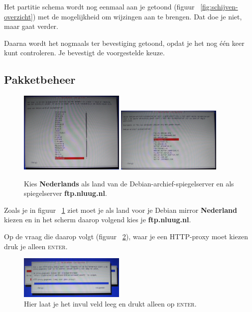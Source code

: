 \documentclass[12pt,a4paper]{article}
\begin{document}
Het partitie schema wordt nog eenmaal aan je getoond (figuur ~\ref{fig:schijven-overzicht}) met de mogelijkheid om wijzingen aan te brengen. Dat doe je niet, maar gaat verder.

Daarna wordt het nogmaals ter bevestiging getoond, opdat je het nog \'{e}\'{e}n keer kunt controleren. Je bevestigt de voorgestelde keuze.


\subsection{Pakketbeheer}

\begin{figure}[H]
\centering
\includegraphics[width=0.45\textwidth]{pakketbeheer-landkeuze-scherm}
\includegraphics[width=0.45\textwidth]{pakketbeheer-mirror-scherm}
\caption{Kies \textbf{Nederlands} als land van de Debian-archief-spiegelserver en als spiegelserver \textbf{ftp.nluug.nl}.}
\label{fig:pakketten}
\end{figure}

Zoals je in figuur ~\ref{fig:pakketten} ziet moet je als land voor je Debian mirror \textbf{Nederland} kiezen en in het scherm daarop volgend kies je \textbf{ftp.nluug.nl}. 


Op de vraag die daarop volgt (figuur ~\ref{fig:httpproxy}), waar je een HTTP-proxy moet kiezen druk je alleen \textsc{enter}.

\begin{figure}[H]
\centering
\includegraphics[width=0.45\textwidth]{pakketbeheer-proxy-scherm}
\caption{Hier laat je het invul veld leeg en drukt alleen op \textsc{enter}.}
\label{fig:httpproxy}
\end{figure}
\end{document}
